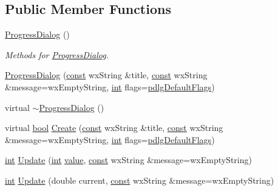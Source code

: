 \subsection*{Public Member Functions}
\begin{DoxyCompactItemize}
\item 
\hyperlink{class_progress_dialog_a9eb988b4df9ed5c09f094208ae9dbf09}{Progress\+Dialog} ()
\begin{DoxyCompactList}\small\item\em Methods for \hyperlink{class_progress_dialog}{Progress\+Dialog}. \end{DoxyCompactList}\item 
\hyperlink{class_progress_dialog_ad69ac0a19d61e79895052e88cd78258c}{Progress\+Dialog} (\hyperlink{getopt1_8c_a2c212835823e3c54a8ab6d95c652660e}{const} wx\+String \&title, \hyperlink{getopt1_8c_a2c212835823e3c54a8ab6d95c652660e}{const} wx\+String \&message=wx\+Empty\+String, \hyperlink{xmltok_8h_a5a0d4a5641ce434f1d23533f2b2e6653}{int} flags=\hyperlink{_progress_dialog_8h_adc85bd6cdc8c05a110bc1f61b2130ca2affbc18282bf6628471d5e37851e1bd41}{pdlg\+Default\+Flags})
\item 
virtual \hyperlink{class_progress_dialog_a6e479e85631a101a90d58211c52bf098}{$\sim$\+Progress\+Dialog} ()
\item 
virtual \hyperlink{mac_2config_2i386_2lib-src_2libsoxr_2soxr-config_8h_abb452686968e48b67397da5f97445f5b}{bool} \hyperlink{class_progress_dialog_a010229780fbca79fcbb0cef5d5921cec}{Create} (\hyperlink{getopt1_8c_a2c212835823e3c54a8ab6d95c652660e}{const} wx\+String \&title, \hyperlink{getopt1_8c_a2c212835823e3c54a8ab6d95c652660e}{const} wx\+String \&message=wx\+Empty\+String, \hyperlink{xmltok_8h_a5a0d4a5641ce434f1d23533f2b2e6653}{int} flags=\hyperlink{_progress_dialog_8h_adc85bd6cdc8c05a110bc1f61b2130ca2affbc18282bf6628471d5e37851e1bd41}{pdlg\+Default\+Flags})
\item 
\hyperlink{xmltok_8h_a5a0d4a5641ce434f1d23533f2b2e6653}{int} \hyperlink{class_progress_dialog_a9b30082ae25b77cc5229576547c01aa6}{Update} (\hyperlink{xmltok_8h_a5a0d4a5641ce434f1d23533f2b2e6653}{int} \hyperlink{lib_2expat_8h_a4a30a13b813682e68c5b689b45c65971}{value}, \hyperlink{getopt1_8c_a2c212835823e3c54a8ab6d95c652660e}{const} wx\+String \&message=wx\+Empty\+String)
\item 
\hyperlink{xmltok_8h_a5a0d4a5641ce434f1d23533f2b2e6653}{int} \hyperlink{class_progress_dialog_a15117b8784bb36474ab80bf58c35832f}{Update} (double current, \hyperlink{getopt1_8c_a2c212835823e3c54a8ab6d95c652660e}{const} wx\+String \&message=wx\+Empty\+String)

\end{DoxyCompactItemize}
